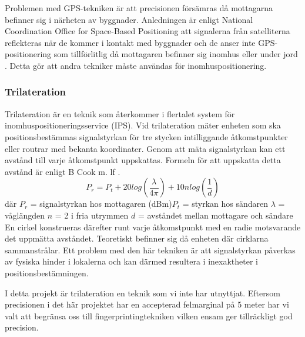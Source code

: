 \documentclass[swedish, a4paper,12pt]{article}
\begin{document}
Problemen med GPS-tekniken är att precisionen försämras då mottagarna befinner sig i närheten av byggnader. Anledningen är enligt National Coordination Office for Space-Based Positioning att signalerna från satelliterna reflekteras när de kommer i kontakt med byggnader och de anser inte GPS-positionering som tillförlitlig då mottagaren befinner sig inomhus eller under jord \cite{GPS_US_ACCURACY}. Detta gör att andra tekniker måste användas för inomhuspositionering.

\subsubsection{Trilateration}\label{triangulering}
Trilateration är en teknik som återkommer i flertalet system för inomhuspositioneringsservice (IPS). Vid trilateration mäter enheten som ska positionsbestämmas signalstyrkan för tre stycken intilliggande åtkomstpunkter eller routrar med bekanta koordinater. Genom att mäta signalstyrkan kan ett avstånd till varje åtkomstpunkt uppskattas. Formeln för att uppskatta detta avstånd är enligt B Cook m. lf \cite{cook2005indoor}.
\newline
$$ P_r = P_t + 20log(\frac{\lambda}{4\pi}) + 10nlog(\frac{1}{d})$$
där
$  P_r $ = signalstyrkan hos mottagaren (dBm)\newline $P_t$ = styrkan hos sändaren\newline
$\lambda$ = våglängden\newline
$ n $ = 2 i fria utrymmen\newline
$ d $ = avståndet mellan mottagare och sändare
\bigskip
\newline
En cirkel konstrueras därefter runt varje åtkomstpunkt med en radie motsvarande det uppmätta avståndet. %
Teoretiskt befinner sig då enheten där cirklarna sammanstrålar. Ett problem med den här tekniken är att signalstyrkan påverkas av fysiska hinder i lokalerna och kan därmed resultera i inexaktheter i positionsbestämningen.

I detta projekt är trilateration en teknik som vi inte har utnyttjat. Eftersom precisionen i det här projektet har en accepterad felmarginal på 5 meter har vi valt att begränsa oss till fingerprintingtekniken vilken ensam ger tillräckligt god precision.
\iffalse
\end{document}
